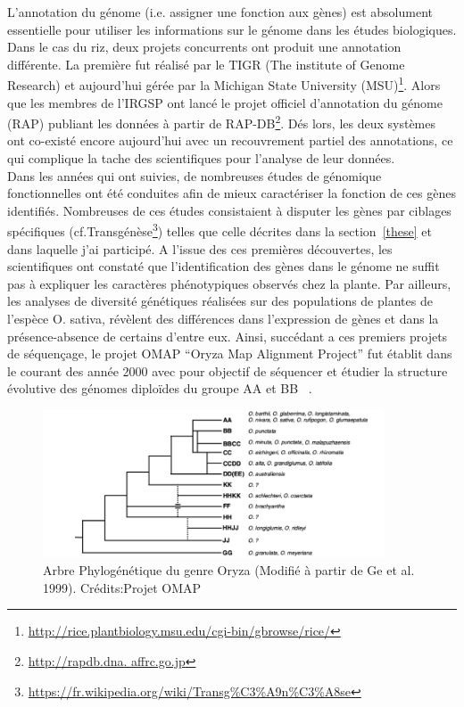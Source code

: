 L'annotation du génome (i.e. assigner une fonction aux gènes) est absolument essentielle pour utiliser les informations sur le génome dans les études biologiques. Dans le cas du riz, deux projets concurrents ont produit une annotation différente. La première fut réalisé par le TIGR (The institute of Genome Research) et aujourd'hui gérée par la Michigan State University (MSU)\footnote{\url{http://rice.plantbiology.msu.edu/cgi-bin/gbrowse/rice/}}. Alors que les membres de l'IRGSP ont lancé le projet officiel d'annotation du génome (RAP) publiant les données à partir de RAP-DB\footnote{\url{http://rapdb.dna. affrc.go.jp}}. Dés lors, les deux systèmes ont co-existé encore aujourd'hui avec un recouvrement partiel des annotations, ce qui complique la tache des scientifiques pour l'analyse de leur données.\\

Dans les années qui ont suivies, de nombreuses études de génomique fonctionnelles ont été conduites afin de mieux caractériser la fonction de ces gènes identifiés. Nombreuses de ces études consistaient à disputer les gènes par ciblages spécifiques (cf.Transgénèse\footnote{\url{https://fr.wikipedia.org/wiki/Transg\%C3\%A9n\%C3\%A8se}}) telles que celle décrites dans la section~\ref{these} et dans laquelle j'ai participé. A l'issue des ces premières découvertes, les scientifiques ont constaté que l'identification des gènes dans le génome ne suffit pas à expliquer les caractères phénotypiques observés chez la plante.  Par ailleurs, les analyses de diversité génétiques réalisées sur des populations de plantes de l'espèce O. sativa, révèlent des différences dans l'expression de gènes et dans la présence-absence de certains d'entre eux. Ainsi, succédant a ces premiers projets de séquençage, le projet OMAP “Oryza Map Alignment Project” fut établit dans le courant des année 2000 avec pour objectif de séquencer et étudier la structure évolutive des génomes diploïdes du groupe AA et BB ~\cite{wing2005}.\\ 

\begin{figure}[!ht]
    \centering
    \includegraphics[width=0.9\textwidth]{hdr_manuscript/Figures/pylogenetic-tree.png}
    \caption{Arbre Phylogénétique du genre Oryza (Modifié à partir de Ge et al. 1999).  Crédits:Projet OMAP}
    \label{fig:genus}
\end{figure}

